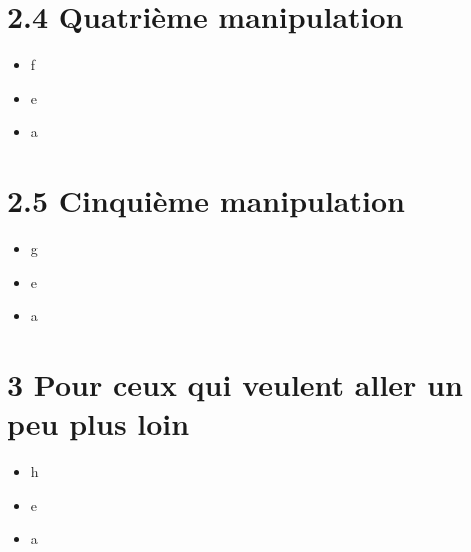 \documentclass{article}
\begin{document}
\section*{2.4 Quatrième manipulation}

\begin{itemize}\renewcommand{\labelitemi}{$\bullet$}
\item f
\item e
\item a
\end{itemize}


\section*{2.5 Cinquième manipulation}

\begin{itemize}\renewcommand{\labelitemi}{$\bullet$}
\item g
\item e
\item a
\end{itemize}


\section*{3 Pour ceux qui veulent aller un peu plus loin}

\begin{itemize}\renewcommand{\labelitemi}{$\bullet$}
\item h
\item e
\item a
\end{itemize}
\end{document}
